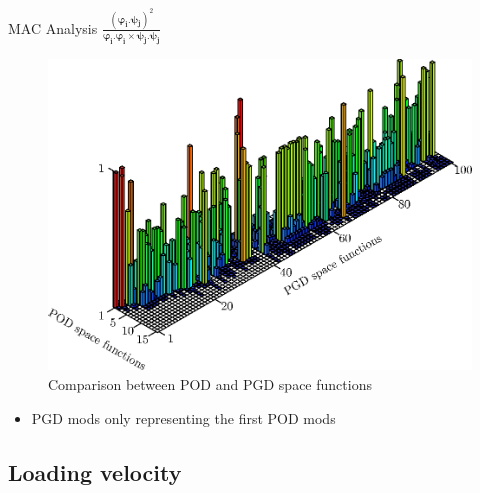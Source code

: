 \documentclass[12pt]{beamer}
\begin{document}
\begin{frame}{MAC Analysis
	$\frac{\left(\boldsymbol{\varphi_i.\psi_j}\right)^2}{\boldsymbol{\varphi_i.\varphi_i \times \psi_j.\psi_j}}$} 
	\vspace{-0.75cm}
	\begin{figure}
	\includegraphics[width=0.7\linewidth]{MAC-POD-PGD.eps}
	\vspace{-0.4cm}
	\caption{Comparison between POD and PGD space functions}
	\end{figure}
	\vspace{-0.75cm}
	\begin{itemize}
		\item PGD mods only representing the first POD mods
	\end{itemize}
\end{frame}


\subsection{Loading velocity}
\end{document}
